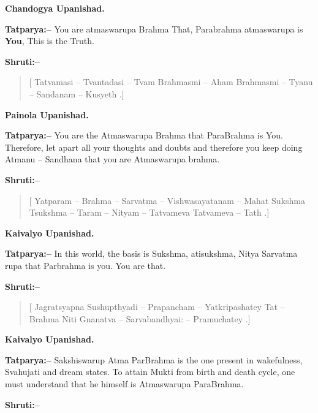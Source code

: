 \begin{flushright}
\textbf{Chandogya Upanishad.}
\end{flushright}

\textbf{Tatparya:–} You are atmaswarupa Brahma That, Parabrahma atmaswarupa is \textbf{You}, This is the Truth.

\textbf{Shruti:–}

\begin{verse}
[ Tatvamasi – Tvantadasi – Tvam Brahmasmi – Aham Brahmasmi – Tyanu – Sandanam – Kusyeth .]
\end{verse}

\begin{flushright}
\textbf{Painola Upanishad.}
\end{flushright}

\textbf{Tatparya:–} You are the Atmaswarupa Brahma that ParaBrahma is You. Therefore, let apart all your thoughts and doubts and therefore you keep doing Atmanu – Sandhana that you are Atmaswarupa brahma.

\textbf{Shruti:–}

\begin{verse}
[ Yatparam – Brahma – Sarvatma – Vishwasayatanam – Mahat  Sukshma Tsukshma – Taram – Nityam – Tatvameva Tatvameva – Tath .]
\end{verse}

\begin{flushright}
\textbf{Kaivalyo Upanishad.}
\end{flushright}

\textbf{Tatparya:–} In this world, the basis is Sukshma, atisukshma, Nitya Sarvatma rupa that Parbrahma is you. You are that.

\textbf{Shruti:–}

\begin{verse}
[ Jagratsyapna Sushupthyadi – Prapancham – Yatkripashatey  Tat – Brahma Niti Gnanatva – Sarvabandhyai: – Pramuchatey .]
\end{verse}

\begin{flushright}
\textbf{Kaivalyo Upanishad.}
\end{flushright}

\textbf{Tatparya:–} Sakshiswarup Atma ParBrahma is the one present in wakefulness, Svahujati and dream states. To attain Mukti from birth and death cycle, one must understand that he himself is Atmaswarupa ParaBrahma.

\textbf{Shruti:–}

